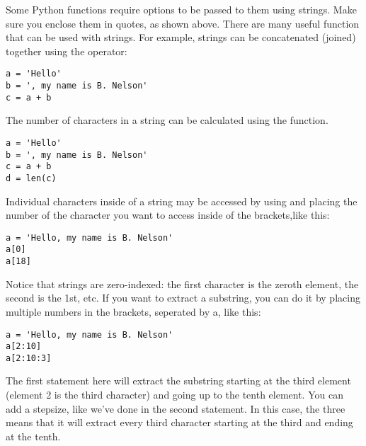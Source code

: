 Some Python functions require options to be passed to them using
strings. Make sure you enclose them in quotes, as shown
above.  There are many useful function that can be used with strings.
For example, strings can be concatenated (joined) together using the
\code{+} operator:
\begin{Verbatim}
a = 'Hello'
b = ', my name is B. Nelson'
c = a + b
\end{Verbatim}
The number of characters in a string can be calculated using the
 function.
\begin{Verbatim}
a = 'Hello'
b = ', my name is B. Nelson'
c = a + b
d = len(c)
\end{Verbatim}
Individual characters inside of a string may be accessed  by using
\code{[]} and placing the number of the character you want to access
inside of the brackets,like this:
\begin{Verbatim}
a = 'Hello, my name is B. Nelson'
a[0]
a[18]
\end{Verbatim}
Notice that strings are zero-indexed: the first character is the
zeroth element, the second is the 1st, etc.  If you want to extract a
substring, you can do it by placing multiple numbers in the brackets,
seperated by a\code{:}, like this:
\begin{Verbatim}
a = 'Hello, my name is B. Nelson'
a[2:10]
a[2:10:3]
\end{Verbatim}
The first statement here will extract the substring starting at the
third element (element 2 is the third character) and going up to the
tenth element.  You can add a stepsize, like we've done in the second
statement.  In this case, the three means that it will extract every
third character starting at the third and ending at the tenth.
